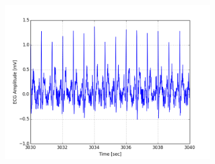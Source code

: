 \documentclass[paper=a4, fontsize=11pt]{scrartcl}
\numberwithin{equation}{section}		%
\numberwithin{figure}{section}			%
\numberwithin{table}{section}		    %
\begin{document}
\begin{appendices}
\begin{figure}[H]
\begin{subfigure}[b]{0.3\textwidth}
		\includegraphics[width=\textwidth]{sim/ecg_57}
	\end{subfigure}
\end{figure}


\end{appendices}
\end{document}
